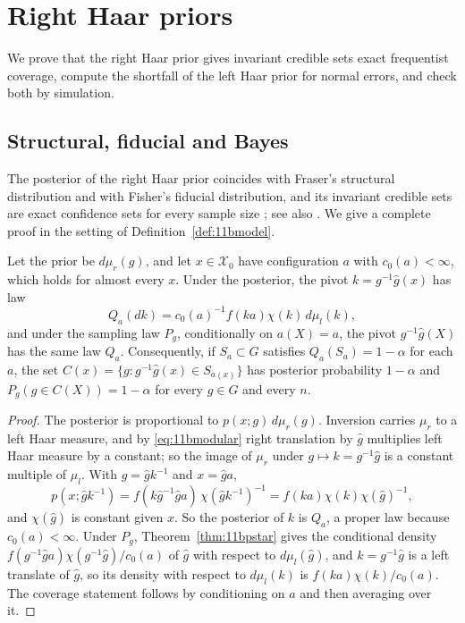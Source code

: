 \section{Right Haar priors}\label{sec:11bright}

We prove that the right Haar prior gives invariant credible sets exact frequentist coverage, compute the shortfall of the left Haar prior for normal errors, and check both by simulation.

\subsection{Structural, fiducial and Bayes}

The posterior of the right Haar prior coincides with Fraser's structural distribution and with Fisher's fiducial distribution, and its invariant credible sets are exact confidence sets for every sample size \cite{fraser1968,stein1965,horabuehler1966}; see also \cite{berger1985,eaton1989}. We give a complete proof in the setting of Definition~\ref{def:11bmodel}.

\begin{theorem}\label{thm:11bright}
Let the prior be $d\mu_r(g)$, and let $x\in\mathcal X_0$ have configuration $a$ with $c_0(a)<\infty$, which holds for almost every $x$. Under the posterior, the pivot $k=g^{-1}\hat g(x)$ has law
\[
Q_a(dk)=c_0(a)^{-1}f(ka)\chi(k)\,d\mu_l(k),
\]
and under the sampling law $P_g$, conditionally on $a(X)=a$, the pivot $g^{-1}\hat g(X)$ has the same law $Q_a$. Consequently, if $S_a\subset G$ satisfies $Q_a(S_a)=1-\alpha$ for each $a$, the set $C(x)=\{g:g^{-1}\hat g(x)\in S_{a(x)}\}$ has posterior probability $1-\alpha$ and $P_g(g\in C(X))=1-\alpha$ for every $g\in G$ and every $n$.
\end{theorem}

\begin{proof}
The posterior is proportional to $p(x;g)\,d\mu_r(g)$. Inversion carries $\mu_r$ to a left Haar measure, and by \eqref{eq:11bmodular} right translation by $\hat g$ multiplies left Haar measure by a constant; so the image of $\mu_r$ under $g\mapsto k=g^{-1}\hat g$ is a constant multiple of $\mu_l$. With $g=\hat gk^{-1}$ and $x=\hat ga$,
\[
p(x;\hat gk^{-1})=f(k\hat g^{-1}\hat ga)\,\chi(\hat gk^{-1})^{-1}=f(ka)\chi(k)\chi(\hat g)^{-1},
\]
and $\chi(\hat g)$ is constant given $x$. So the posterior of $k$ is $Q_a$, a proper law because $c_0(a)<\infty$. Under $P_g$, Theorem~\ref{thm:11bpstar} gives the conditional density $f(g^{-1}\hat ga)\chi(g^{-1}\hat g)/c_0(a)$ of $\hat g$ with respect to $d\mu_l(\hat g)$, and $k=g^{-1}\hat g$ is a left translate of $\hat g$, so its density with respect to $d\mu_l(k)$ is $f(ka)\chi(k)/c_0(a)$. The coverage statement follows by conditioning on $a$ and then averaging over it.
\end{proof}

